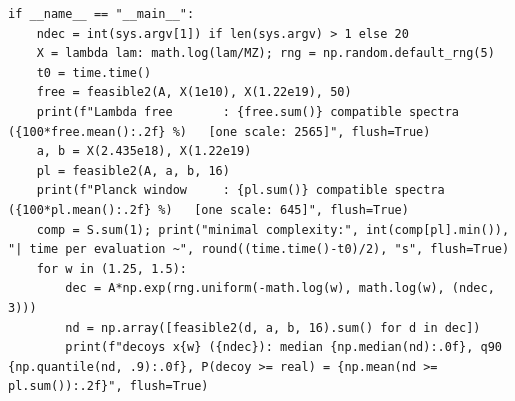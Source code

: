 \documentclass[11pt,a4paper]{article}
\begin{document}
\begin{lstlisting}
if __name__ == "__main__":
    ndec = int(sys.argv[1]) if len(sys.argv) > 1 else 20
    X = lambda lam: math.log(lam/MZ); rng = np.random.default_rng(5)
    t0 = time.time()
    free = feasible2(A, X(1e10), X(1.22e19), 50)
    print(f"Lambda free       : {free.sum()} compatible spectra ({100*free.mean():.2f} %)   [one scale: 2565]", flush=True)
    a, b = X(2.435e18), X(1.22e19)
    pl = feasible2(A, a, b, 16)
    print(f"Planck window     : {pl.sum()} compatible spectra ({100*pl.mean():.2f} %)   [one scale: 645]", flush=True)
    comp = S.sum(1); print("minimal complexity:", int(comp[pl].min()), "| time per evaluation ~", round((time.time()-t0)/2), "s", flush=True)
    for w in (1.25, 1.5):
        dec = A*np.exp(rng.uniform(-math.log(w), math.log(w), (ndec, 3)))
        nd = np.array([feasible2(d, a, b, 16).sum() for d in dec])
        print(f"decoys x{w} ({ndec}): median {np.median(nd):.0f}, q90 {np.quantile(nd, .9):.0f}, P(decoy >= real) = {np.mean(nd >= pl.sum()):.2f}", flush=True)
\end{lstlisting}
\end{document}
